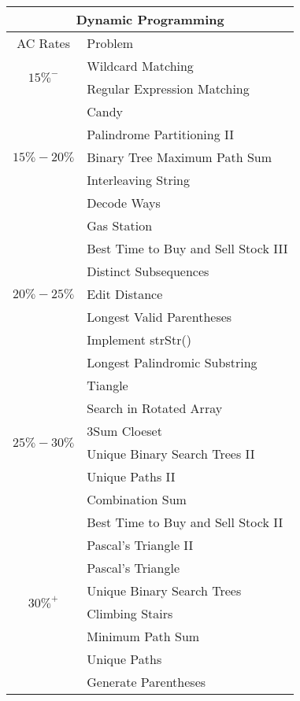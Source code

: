 \documentclass[paper=a4, fontsize=11pt]{scrartcl} %
\begin{document}
\begin{center}
  \begin{tabular}{|c|l|}
      \hline
      \multicolumn{2}{|c|}{Dynamic Programming} \\
      \hline
      AC Rates      &   Problem     \\
      \hline
      \multirow{2}{*}{$15\%^-$}  &   Wildcard Matching\\
          & Regular Expression Matching\\
      \hline
      \multirow{5}{*}{$15\%-20\%$}  &   Candy\\
          & Palindrome Partitioning II  \\
          & Binary Tree Maximum Path Sum \\
          & Interleaving String\\
          & Decode Ways\\
      \hline
      \multirow{7}{*}{$20\%-25\%$}  &   Gas Station    \\
          & Best Time to Buy and Sell Stock III\\
          & Distinct Subsequences \\
          & Edit Distance\\
          & Longest Valid Parentheses\\
          & Implement strStr()\\
          & Longest Palindromic Substring\\
      \hline
      \multirow{6}{*}{$25\%-30\%$}  &   Tiangle\\
          & Search in Rotated Array\\
          & 3Sum Cloeset\\
          & Unique Binary Search Trees II\\
          & Unique Paths II\\
          & Combination Sum\\
      \hline
      \multirow{8}{*}{$30\%^+$}  &   Best Time to Buy and Sell Stock II \\
          & Pascal's Triangle II \\
          & Pascal's Triangle \\
          & Unique Binary Search Trees \\
          & Climbing Stairs\\
          & Minimum Path Sum\\
          & Unique Paths\\
          & Generate Parentheses\\
      \hline
  \end{tabular}

\end{center}
\end{document}
